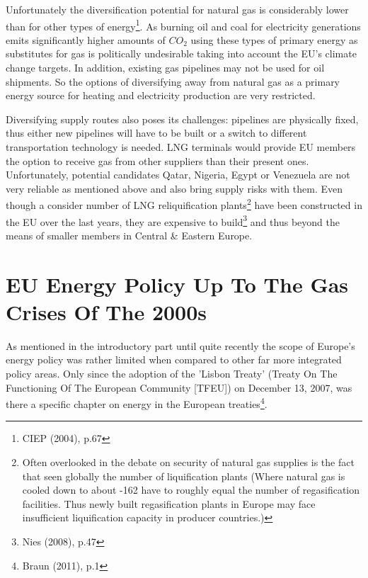 \documentclass[11pt,a4paper,english]{scrreprt}
\begin{document}
Unfortunately the diversification potential for natural gas is considerably
lower than for other types of energy\footnote{CIEP (2004), p.67}. As burning oil
and coal for electricity generations emits significantly higher amounts of
$CO_{2}$ using these types of primary energy as substitutes for gas is
politically undesirable taking into account the EU's climate change targets.
In addition, existing gas pipelines may not be used for oil shipments. So the
options of diversifying away from natural gas as a primary energy source for
heating and electricity production are very restricted.\par

Diversifying supply routes also poses its challenges: pipelines are physically
fixed, thus either new pipelines will have to be built or a switch to different
transportation technology is needed. LNG terminals would provide EU
members the option to receive gas from other suppliers than their present ones.
Unfortunately, potential candidates Qatar, Nigeria, Egypt or Venezuela are not
very reliable as mentioned above and also bring supply risks with them. Even
though a consider number of LNG
reliquification plants\footnote{\textcolor{dunkelgrau.80}{Often overlooked in
the debate on security of natural gas supplies is the fact that seen globally
the number of liquification plants (Where natural gas is cooled down to about
-162 \textcelsius{} have to roughly equal the number of regasification
facilities. Thus newly built regasification plants in Europe may face
insufficient liquification capacity in producer countries.)}} have been
constructed in the EU over the last years, they are expensive to
build\footnote{Nies (2008), p.47} and thus beyond the means of smaller
members in Central \& Eastern Europe.\par






\chapter{EU Energy Policy Up To The Gas Crises Of The 2000s}



As mentioned in the introductory part until quite recently the scope of
Europe's energy policy was rather limited when compared to other far more
integrated policy areas. Only since the adoption of the 'Lisbon Treaty' (Treaty
On The Functioning Of The European Community [TFEU]) on December 13, 2007,
was there a specific chapter on energy in the European
treaties\footnote{Braun (2011), p.1}.\par
\end{document}

